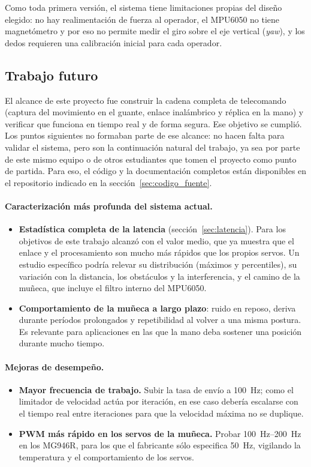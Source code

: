 Como toda primera versión, el sistema tiene limitaciones propias del diseño elegido: no hay realimentación de fuerza al operador, el MPU6050 no tiene magnetómetro y por eso no permite medir el giro sobre el eje vertical (\textit{yaw}), y los dedos requieren una calibración inicial para cada operador.

\subsection{Trabajo futuro}

El alcance de este proyecto fue construir la cadena completa de telecomando (captura del movimiento en el guante, enlace inalámbrico y réplica en la mano) y verificar que funciona en tiempo real y de forma segura. Ese objetivo se cumplió. Los puntos siguientes no formaban parte de ese alcance: no hacen falta para validar el sistema, pero son la continuación natural del trabajo, ya sea por parte de este mismo equipo o de otros estudiantes que tomen el proyecto como punto de partida. Para eso, el código y la documentación completos están disponibles en el repositorio indicado en la sección~\ref{sec:codigo_fuente}.

\paragraph{Caracterización más profunda del sistema actual.}
\begin{itemize}
    \item \textbf{Estadística completa de la latencia} (sección~\ref{sec:latencia}). Para los objetivos de este trabajo alcanzó con el valor medio, que ya muestra que el enlace y el procesamiento son mucho más rápidos que los propios servos. Un estudio específico podría relevar su distribución (máximos y percentiles), su variación con la distancia, los obstáculos y la interferencia, y el camino de la muñeca, que incluye el filtro interno del MPU6050.
    \item \textbf{Comportamiento de la muñeca a largo plazo}: ruido en reposo, deriva durante períodos prolongados y repetibilidad al volver a una misma postura. Es relevante para aplicaciones en las que la mano deba sostener una posición durante mucho tiempo.
\end{itemize}

\paragraph{Mejoras de desempeño.}
\begin{itemize}
    \item \textbf{Mayor frecuencia de trabajo.} Subir la tasa de envío a \SI{100}{\hertz}; como el limitador de velocidad actúa por iteración, en ese caso debería escalarse con el tiempo real entre iteraciones para que la velocidad máxima no se duplique.
    \item \textbf{PWM más rápido en los servos de la muñeca.} Probar \SIrange{100}{200}{\hertz} en los MG946R, para los que el fabricante sólo especifica \SI{50}{\hertz}, vigilando la temperatura y el comportamiento de los servos.
\end{itemize}

